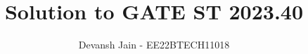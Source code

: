 \documentclass[journal,12pt,onecolumn]{IEEEtran}
\theoremstyle{remark}
\begin{document}
%




\vspace{3cm}

\title{Solution to GATE ST 2023.40}
\author{Devansh Jain - EE22BTECH11018}


%
%
%

% 
%



% 
\end{document}
